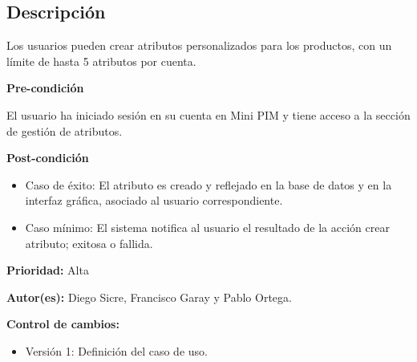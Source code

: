 

\subsection*{Descripción}
Los usuarios pueden crear atributos personalizados para los productos, con un límite de hasta 5 atributos por cuenta.
\vspace{0.15cm}

\textbf{Pre-condición}\par
El usuario ha iniciado sesión en su cuenta en Mini PIM y tiene acceso a la sección de gestión de atributos.\par
\vspace{0.15cm}

\textbf{Post-condición}
\begin{itemize}
    \item Caso de éxito: El atributo es creado y reflejado en la base de datos y en la interfaz gráfica, asociado al usuario correspondiente.
    \item Caso mínimo: El sistema notifica al usuario el resultado de la acción crear atributo; exitosa o fallida.
\end{itemize}

\textbf{Prioridad: }
Alta
\vspace{0.15cm}

\textbf{Autor(es): }
Diego Sicre, Francisco Garay y Pablo Ortega.\par
\vspace{0.15cm}

\textbf{Control de cambios: }
\begin{itemize}
    \item Versión 1: Definición del caso de uso.
\end{itemize}

